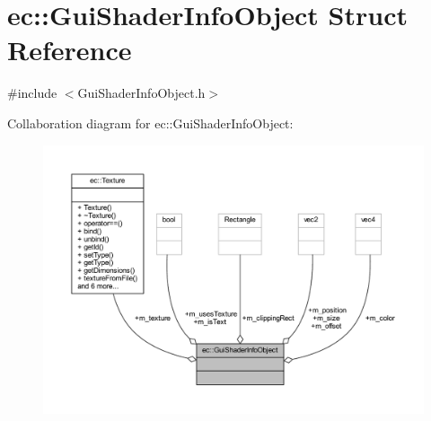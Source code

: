 \hypertarget{structec_1_1_gui_shader_info_object}{}\section{ec\+:\+:Gui\+Shader\+Info\+Object Struct Reference}
\label{structec_1_1_gui_shader_info_object}


{\ttfamily \#include $<$Gui\+Shader\+Info\+Object.\+h$>$}



Collaboration diagram for ec\+:\+:Gui\+Shader\+Info\+Object\+:\nopagebreak
\begin{figure}[H]
\begin{center}
\leavevmode
\includegraphics[width=350pt]{structec_1_1_gui_shader_info_object__coll__graph}
\end{center}
\end{figure}
